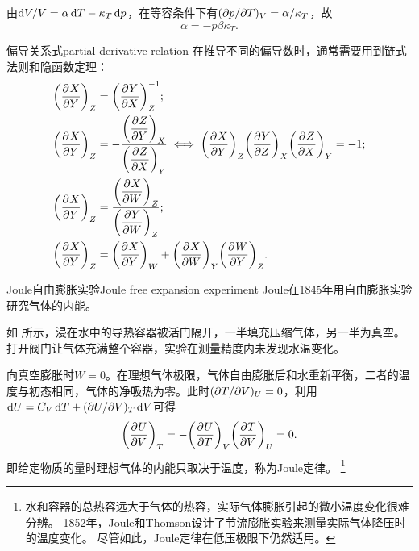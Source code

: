 \begin{corollary}
	由$\d V/V = \alpha\d T - \kappa_T\d p$，在等容条件下有$(\p p/\p T)_V = \alpha/\kappa_T$，故
	\begin{equation}
		\alpha = -p\beta\kappa_T.
	\end{equation}
\end{corollary}



\begin{theorem}
	{偏导关系式}{partial derivative relation}
	在推导不同的偏导数时，通常需要用到链式法则和隐函数定理：
	\begin{subequations}
		\begin{align}
			\label{eqn:XY->YX}
			\pvat{X}{Y}{Z} &= \pvat{Y}{X}{Z}^{-1};\\
			\label{eqn:XY*YZ*ZX=-1}
			\pvat{X}{Y}{Z} &= -\fracdisp{\pvat{Z}{Y}{X}}{\pvat{Z}{X}{Y}} \iff \pvat{X}{Y}{Z}\pvat{Y}{Z}{X}\pvat{Z}{X}{Y} = -1;\\
			\label{eqn:XY->XW/YW}
			\pvat{X}{Y}{Z} &= \fracdisp{\pvat{X}{W}{Z}}{\pvat{Y}{W}{Z}};\\
			\label{eqn:XY->XY+XW*WY}
			\pvat{X}{Y}{Z} &= \pvat{X}{Y}{W} + \pvat{X}{W}{Y}\pvat{W}{Y}{Z}.
		\end{align}
	\end{subequations}
\end{theorem}

\begin{example}
	{Joule自由膨胀实验}{Joule free expansion experiment}
	Joule在1845年用自由膨胀实验研究气体的内能。
	\begin{notecaptionblock}
		\label{fig:Joule free expansion}
	\end{notecaptionblock}
	如 所示，浸在水中的导热容器被活门隔开，一半填充压缩气体，另一半为真空。打开阀门让气体充满整个容器，实验在测量精度内未发现水温变化。

	向真空膨胀时$W = 0$。在理想气体极限，气体自由膨胀后和水重新平衡，二者的温度与初态相同，气体的净吸热为零。此时$(\p T/\p V)_U = 0$，利用$\d U = C_V\d T + (\p U/\p V)_T\d V$可得
	\[
		\pvat{U}{V}{T} = -\pvat{U}{T}{V}\pvat{T}{V}{U} = 0.
	\]
	即给定物质的量时理想气体的内能只取决于温度，称为Joule定律。
	\footnote{
		水和容器的总热容远大于气体的热容，实际气体膨胀引起的微小温度变化很难分辨。
		1852年，Joule和Thomson设计了节流膨胀实验来测量实际气体降压时的温度变化。
		尽管如此，Joule定律在低压极限下仍然适用。
	}
\end{example}

